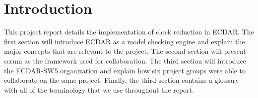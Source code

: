 \chapter{Introduction}
This project report details the implementation of clock reduction in ECDAR. The first section will introduce ECDAR as a model checking engine and explain the major concepts that are relevant to the project. The second section will present scrum as the framework used for collaboration. The third section will introduce the ECDAR-SW5 organization and explain how six project groups were able to collaborate on the same project. Finally, the third section contains a glossary with all of the terminology that we use throughout the report.




















